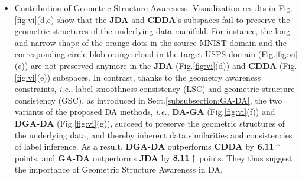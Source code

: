 \documentclass[journal,twocolumn]{IEEEtran}
\begin{document}
\begin{CJK*}{UTF8}{gkai}
\begin{itemize}
    \item Contribution of Geometric Structure Awareness. Visualization results in Fig.\ref{fig:vi}(d,e) show that the \textbf{JDA} and \textbf{CDDA}'s subspaces fail to preserve the geometric structures of the underlying data manifold. For instance, the long and narrow shape of the orange dots in the source MNIST domain and the corresponding circle blob orange cloud in the target USPS domain (Fig.\ref{fig:vi}(c)) are not preserved anymore in the \textbf{JDA} (Fig.\ref{fig:vi}(d)) and \textbf{CDDA} (Fig.\ref{fig:vi}(e)) subspaces. In contrast, thanks to the geometry awareness constraints, \textit{i.e.}, label smoothness consistency (LSC) and geometric structure consistency (GSC), as introduced in Sect.\ref{subsubsection:GA-DA}, the two variants of the proposed DA methods, \textit{i.e.}, \textbf{DA-GA} (Fig.\ref{fig:vi}(f)) and \textbf{DGA-DA} (Fig.\ref{fig:vi}(g)), succeed to preserve the geometric structures of the underlying data, and thereby inherent data similarities and consistencies of label inference. As a result,  \textbf{DGA-DA} outperforms \textbf{CDDA} by ${\bf 6.11}\uparrow$ points, and \textbf{GA-DA} outperforms \textbf{JDA} by ${\bf 8.11}\uparrow$ points. They thus suggest the importance of Geometric Structure Awareness in DA. 
    
    
    
	 	
\end{itemize}	

    
    


	




\end{CJK*}
\end{document}
